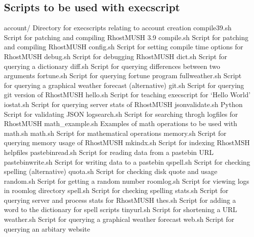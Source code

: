\documentclass[letterpaper,10pt,english]{sphinxmanual}
\begin{document}
\subsection{Scripts to be used with execscript}
\label{\detokenize{advanced:scripts-to-be-used-with-execscript}}
\sphinxAtStartPar
account/                       \textendash{} Directory for execscripts relating to account creation
compile39.sh                   \textendash{} Script for patching and compiling RhostMUSH 3.9
compile.sh                     \textendash{} Script for patching and compiling RhostMUSH
config.sh                      \textendash{} Script for setting compile time options for RhostMUSH
debug.sh                       \textendash{} Script for debugging RhostMUSH
dict.sh                        \textendash{} Script for querying a dictionary
diff.sh                        \textendash{} Script for querying differences between two arguments
fortune.sh                     \textendash{} Script for querying fortune program
fullweather.sh                 \textendash{} Script for querying a graphical weather forecast (alternative)
git.sh                         \textendash{} Script for querying git version of RhostMUSH
hello.sh                       \textendash{} Script for teaching execscript for ‘Hello World’
iostat.sh                      \textendash{} Script for querying server stats of RhostMUSH
jsonvalidate.sh                \textendash{} Python Script for validating JSON
logsearch.sh                   \textendash{} Script for searching throgh logfiles for RhostMUSH
math\_example.sh                \textendash{} Examples of math operations to be used with math.sh
math.sh                        \textendash{} Script for mathematical operations
memory.sh                      \textendash{} Script for querying memory usage of RhostMUSH
mkindx.sh                      \textendash{} Script for indexing RhostMSH helpfiles
pastebinread.sh                \textendash{} Script for reading data from a pastebin URL
pastebinwrite.sh               \textendash{} Script for writing data to a pastebin
qspell.sh                      \textendash{} Script for checking spelling (alternative)
quota.sh                       \textendash{} Script for checking disk quote and usage
random.sh                      \textendash{} Script for getting a random number
roomlog.sh                     \textendash{} Script for viewing logs in roomlog directory
spell.sh                       \textendash{} Script for checking spelling
stats.sh                       \textendash{} Script for querying server and process stats for RhostMUSH
thes.sh                        \textendash{} Script for adding a word to the dictionary for spell scripts
tinyurl.sh                     \textendash{} Script for shortening a URL
weather.sh                     \textendash{} Script for querying a graphical weather forecast
web.sh                         \textendash{} Script for querying an arbitary website
\end{document}
